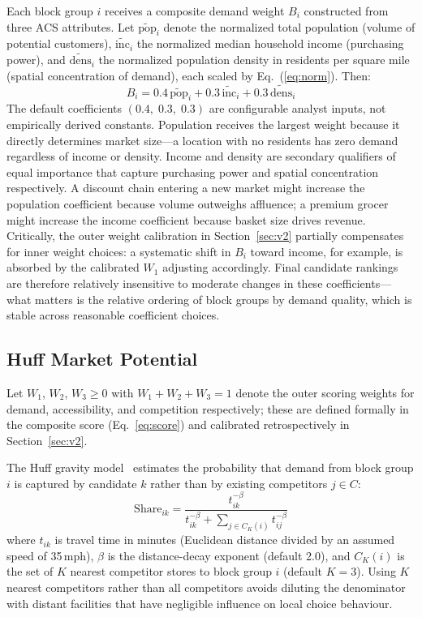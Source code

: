 \documentclass[conference]{IEEEtran}
\begin{document}
Each block group $i$ receives a composite demand weight $B_i$
constructed from three ACS attributes. Let
$\widetilde{\text{pop}}_i$ denote the normalized total population
(volume of potential customers), $\widetilde{\text{inc}}_i$ the
normalized median household income (purchasing power), and
$\widetilde{\text{dens}}_i$ the normalized population density in
residents per square mile (spatial concentration of demand), each
scaled by Eq.~(\ref{eq:norm}). Then:
\begin{equation}
B_i = 0.4\,\widetilde{\text{pop}}_i
    + 0.3\,\widetilde{\text{inc}}_i
    + 0.3\,\widetilde{\text{dens}}_i
\label{eq:demand_weight}
\end{equation}
The default coefficients $(0.4,\;0.3,\;0.3)$ are configurable analyst
inputs, not empirically derived constants. Population receives the
largest weight because it directly determines market size---a location
with no residents has zero demand regardless of income or density.
Income and density are secondary qualifiers of equal importance that
capture purchasing power and spatial concentration respectively.
A discount chain entering a new market might increase the population
coefficient because volume outweighs affluence; a premium grocer might
increase the income coefficient because basket size drives revenue.
Critically, the outer weight calibration in Section~\ref{sec:v2}
partially compensates for inner weight choices: a systematic shift in
$B_i$ toward income, for example, is absorbed by the calibrated $W_1$
adjusting accordingly. Final candidate rankings are therefore
relatively insensitive to moderate changes in these coefficients---what
matters is the relative ordering of block groups by demand quality,
which is stable across reasonable coefficient choices.

\subsection{Huff Market Potential}

Let $W_1$, $W_2$, $W_3 \geq 0$ with $W_1 + W_2 + W_3 = 1$ denote
the outer scoring weights for demand, accessibility, and competition
respectively; these are defined formally in the composite score
(Eq.~\ref{eq:score}) and calibrated retrospectively in
Section~\ref{sec:v2}.

The Huff gravity model~\cite{Huff1964} estimates the probability
that demand from block group $i$ is captured by candidate $k$
rather than by existing competitors $j \in C$:
\begin{equation}
\text{Share}_{ik} = \frac{t_{ik}^{-\beta}}
                         {t_{ik}^{-\beta}
                          + \sum_{j \in C_K(i)} t_{ij}^{-\beta}}
\label{eq:huff}
\end{equation}
where $t_{ik}$ is travel time in minutes (Euclidean distance divided
by an assumed speed of 35\,mph), $\beta$ is the distance-decay
exponent (default 2.0), and $C_K(i)$ is the set of $K$ nearest
competitor stores to block group $i$ (default $K = 3$). Using $K$
nearest competitors rather than all competitors avoids diluting the
denominator with distant facilities that have negligible influence on
local choice behaviour.
\end{document}
